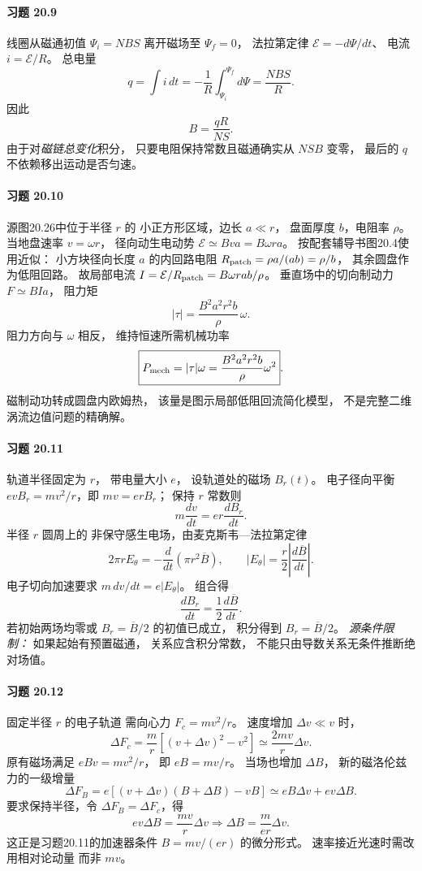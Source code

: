 \paragraph{习题 20.9}
线圈从磁通初值
\(\Psi_i=NBS\) 离开磁场至
\(\Psi_f=0\)，
法拉第定律
\(\mathcal E=-d\Psi/dt\)、
电流 \(i=\mathcal E/R\)。
总电量
\[
 q=\int i\,dt
 =-\frac1R\int_{\Psi_i}^{\Psi_f}d\Psi
 =\frac{NBS}{R}.
\]
因此
\[
 \boxed{B=\frac{qR}{NS}}.
\]
由于对\emph{磁链总变化}积分，
只要电阻保持常数且磁通确实从 \(NSB\) 变零，
最后的 \(q\) 不依赖移出运动是否匀速。

\paragraph{习题 20.10}
源图20.26中位于半径 \(r\) 的
小正方形区域，边长 \(a\ll r\)，
盘面厚度 \(b\)，电阻率 \(\rho\)。
当地盘速率 \(v=\omega r\)，
径向动生电动势
\(\mathcal E\simeq Bva=B\omega r a\)。
按配套辅导书图20.4使用近似：
小方块径向长度 \(a\) 的内回路电阻
\(R_{\rm patch}=\rho a/(ab)=\rho/b\)，
其余圆盘作为低阻回路。
故局部电流
\(I=\mathcal E/R_{\rm patch}
 =B\omega r ab/\rho\)。
垂直场中的切向制动力
\(F\simeq B I a\)，
阻力矩
\[
 \boxed{|\tau|=
 \frac{B^2a^2r^2b}{\rho}\,\omega}.
\]
阻力方向与 \(\omega\) 相反，
维持恒速所需机械功率
\[
 \boxed{P_{\rm mech}=|\tau|\omega
 =\frac{B^2a^2r^2b}{\rho}\omega^2}.
\]
磁制动功转成圆盘内欧姆热，
该量是图示局部低阻回流简化模型，
不是完整二维涡流边值问题的精确解。

\paragraph{习题 20.11}
轨道半径固定为 \(r\)，
带电量大小 \(e\)，
设轨道处的磁场 \(B_r(t)\)。
电子径向平衡
\(e vB_r=mv^2/r\)，即
\(mv=e r B_r\)；
保持 \(r\) 常数则
\[
 m\frac{dv}{dt}=er\frac{dB_r}{dt}.
\]
半径 \(r\) 圆周上的
非保守感生电场，由麦克斯韦—法拉第定律
\[
 2\pi r E_\theta
 =-\frac{d}{dt}
 \left(\pi r^2\overline B\right),
\qquad
 |E_\theta|=\frac r2
 \left|\frac{d\overline B}{dt}\right|.
\]
电子切向加速要求
\(m\,dv/dt=e|E_\theta|\)。
组合得
\[
 \boxed{\frac{dB_r}{dt}
 =\frac12\frac{d\overline B}{dt}}.
\]
若初始两场均零或
\(B_r=\overline B/2\) 的初值已成立，
积分得到
\(\boxed{B_r=\overline B/2}\)。
\emph{源条件限制：}
如果起始有预置磁通，
关系应含积分常数，
不能只由导数关系无条件推断绝对场值。

\paragraph{习题 20.12}
固定半径 \(r\) 的电子轨道
需向心力 \(F_c=mv^2/r\)。
速度增加 \(\Delta v\ll v\) 时，
\[
 \Delta F_c=
 \frac m r[(v+\Delta v)^2-v^2]
 \simeq\frac{2mv}{r}\Delta v.
\]
原有磁场满足 \(eBv=mv^2/r\)，
即 \(eB=mv/r\)。
当场也增加 \(\Delta B\)，
新的磁洛伦兹力的一级增量
\[
 \Delta F_B=e[(v+\Delta v)(B+\Delta B)-vB]
 \simeq eB\Delta v+ev\Delta B.
\]
要求保持半径，令
\(\Delta F_B=\Delta F_c\)，得
\[
 e v\Delta B=\frac{mv}{r}\Delta v
 \Longrightarrow
 \boxed{\Delta B=\frac{m}{er}\Delta v}.
\]
这正是习题20.11的加速器条件
\(B=mv/(er)\) 的微分形式。
速率接近光速时需改用相对论动量
而非 \(mv\)。

